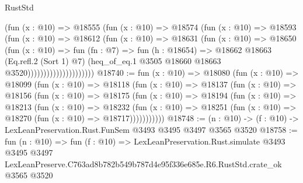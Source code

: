 \begin{lexlean}{RustStd}
\begin{coremodule}
                              (fun (x : @10) =>
                              @18555
                                (fun (x : @10) =>
                                @18574
                                  (fun (x : @10) =>
                                  @18593
                                    (fun (x : @10) =>
                                    @18612
                                      (fun (x : @10) =>
                                      @18631
                                        (fun (x : @10) =>
                                        @18650
                                          (fun (x : @10) =>
                                          fun (fn : @7) =>
                                          fun (h : @18654) =>
                                          @18662
                                            @18663
                                            (Eq.refl.{2} (Sort 1) @7)
                                            (heq_of_eq.{1}
                                              @3505
                                              @18660
                                              @18663
                                              @3520)))))))))))))))))))))
@18740 := fun (x : @10) =>
  @18080
    (fun (x : @10) =>
    @18099
      (fun (x : @10) =>
      @18118
        (fun (x : @10) =>
        @18137
          (fun (x : @10) =>
          @18156
            (fun (x : @10) =>
            @18175
              (fun (x : @10) =>
              @18194
                (fun (x : @10) =>
                @18213
                  (fun (x : @10) =>
                  @18232
                    (fun (x : @10) =>
                    @18251 (fun (x : @10) => @18270 (fun (x : @10) => @18717)))))))))))
@18748 := (n : @10) -> (f : @10) -> LexLeanPreservation.Rust.FunSem @3493 @3495 @3497 @3565 @3520
@18758 := fun (n : @10) =>
  fun (f : @10) =>
  LexLeanPreservation.Rust.simulate
    @3493
    @3495
    @3497
    LexLeanPreserve.C763ad8b782b549b787d4e95f336e685e.R6.RustStd.crate_ok
    @3565
    @3520
\end{coremodule}
\end{lexlean}
